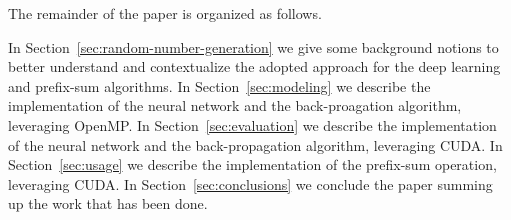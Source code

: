 The remainder of the paper is organized as follows.

In Section~\ref{sec:random-number-generation} we give some background notions to better understand and contextualize the adopted approach for the deep learning and prefix-sum algorithms.
%
In Section~\ref{sec:modeling} we describe the implementation of the neural network and the back-proagation algorithm, leveraging OpenMP.
%
In Section~\ref{sec:evaluation} we describe the implementation of the neural network and the back-propagation algorithm, leveraging CUDA.
%
In Section~\ref{sec:usage} we describe the implementation of the prefix-sum operation, leveraging CUDA.
%
In Section~\ref{sec:conclusions} we conclude the paper summing up the work that has been done.
